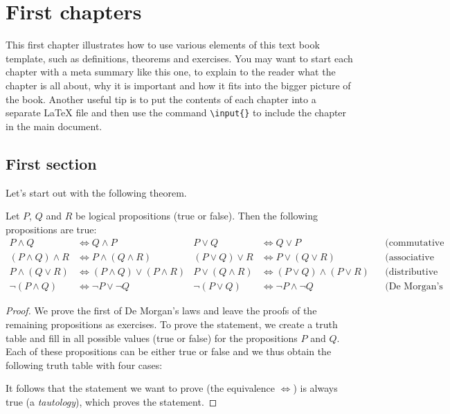 \documentclass[UTF8]{RL}
\begin{document}






\chapter{First chapters}

\begin{summary}
  This first chapter illustrates how to use various elements of this
  text book template, such as definitions, theorems and exercises. You
  may want to start each chapter with a meta summary like this one, to
  explain to the reader what the chapter is all about, why it is
  important and how it fits into the bigger picture of the
  book. Another useful tip is to put the contents of each chapter into
  a separate \LaTeX{} file and then use the command
  \texttt{\textbackslash{}input\{\}} to include the chapter in the
  main document.
\end{summary}

\section{First section}

Let's start out with the following theorem.

\begin{theorem}
  \label{th:logicalgebra}
  Let $P$, $Q$ and $R$ be logical propositions (true or false).
  Then the following propositions are true:
  \small
  \begin{align*}
    P \land Q &\Leftrightarrow Q \land P &
    P \lor  Q &\Leftrightarrow Q \lor P  &&
    \text{(commutative laws)} \\
    (P \land Q) \land R &\Leftrightarrow P \land (Q \land R) &
    (P \lor Q)  \lor  R &\Leftrightarrow P \lor  (Q \lor  R) &&
    \text{(associative laws)} \\
    P \land (Q \lor  R) &\Leftrightarrow (P \land Q) \lor  (P \land R) &
    P \lor  (Q \land R) &\Leftrightarrow (P \lor  Q) \land (P \lor  R) &&
    \text{(distributive laws)} \\
    \lnot (P \land Q) &\Leftrightarrow \lnot P \lor  \lnot Q &
    \lnot (P \lor  Q) &\Leftrightarrow \lnot P \land \lnot Q &&
    \text{(De Morgan's laws)}
  \end{align*}
\end{theorem}
\begin{proof}

  We prove the first of De Morgan's laws and leave the proofs of
  the remaining propositions as exercises. To prove the statement,
  we create a truth table and fill in all possible values (true or
  false) for the propositions $P$ and $Q$. Each of these propositions
  can be either true or false and we thus obtain the following truth
  table with four cases:
 
  It follows that the statement we want to prove (the equivalence $\Leftrightarrow$)
  is always true (a \emph{tautology}), which proves the statement.
\end{proof}
\end{document}

